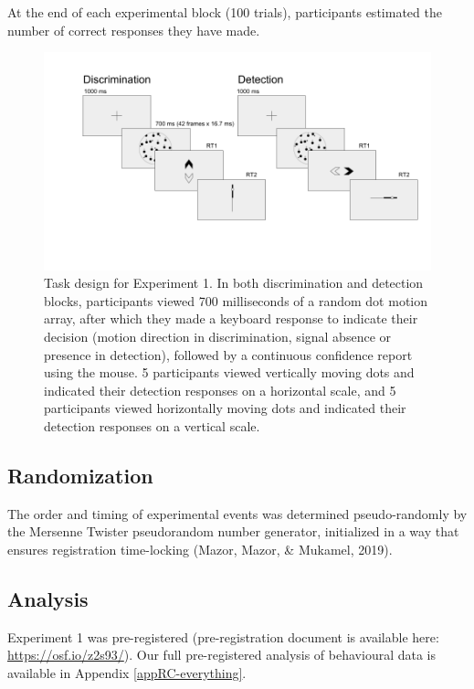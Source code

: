 \documentclass[12pt,twoside]{reedthesis}
\begin{document}
At the end of each experimental block (100 trials), participants estimated the number of correct responses they have made.
\begin{figure}
\includegraphics[width=\textwidth]{figure/RC/designExp1} \caption[Experimental design for Exp. 1]{Task design for Experiment 1. In both discrimination and detection blocks, participants viewed 700 milliseconds of a random dot motion array, after which they made a keyboard response to indicate their decision (motion direction in discrimination, signal absence or presence in detection), followed by a continuous confidence report using the mouse. 5 participants viewed vertically moving dots and indicated their detection responses on a horizontal scale, and 5 participants viewed horizontally moving dots and indicated their detection responses on a vertical scale. }\label{fig:RC-exp1-design}
\end{figure}
\hypertarget{randomization-1}{%
\subsection{Randomization}\label{randomization-1}}

The order and timing of experimental events was determined pseudo-randomly by the Mersenne Twister pseudorandom number generator, initialized in a way that ensures registration time-locking (Mazor, Mazor, \& Mukamel, 2019).

\hypertarget{analysis}{%
\subsection{Analysis}\label{analysis}}

Experiment 1 was pre-registered (pre-registration document is available here: \url{https://osf.io/z2s93/}). Our full pre-registered analysis of behavioural data is available in Appendix \ref{appRC-everything}.
\end{document}
